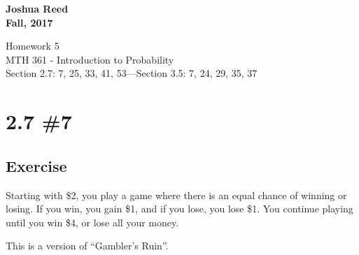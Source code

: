 \documentclass[12pt]{article}
\begin{document}
{%
  \large \bfseries 
  Joshua Reed \\
  Fall, 2017 \\
  \begin{center}
    {\huge Homework 5}\\
    MTH 361 - Introduction to Probability \\%
  Section 2.7: 7, 25, 33, 41, 53---Section 3.5: 7, 24, 29, 35, 37
  \end{center}}
 
 
\section{2.7 \#7} 
\subsection{Exercise}
Starting with \$2, you play a game where there is  an equal chance of winning or losing. If you win, 
you gain \$1, and if you lose, you lose \$1. You continue playing until you win \$4, or lose all your money.

This is a version of ``Gambler's Ruin''.
\end{document}
